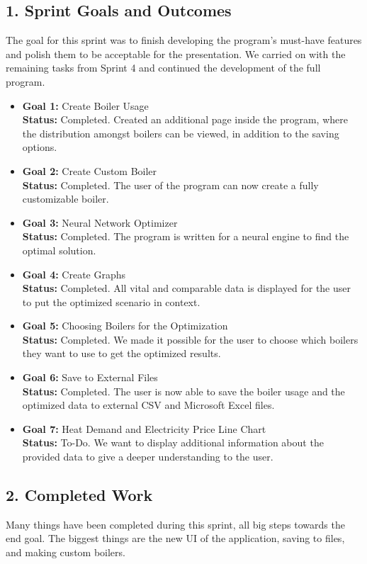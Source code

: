 \documentclass[12pt]{report}
\begin{document}
\subsection*{1. Sprint Goals and Outcomes}
The goal for this sprint was to finish developing the program’s must-have features and polish them to be acceptable for the presentation. We carried on with the remaining tasks from Sprint 4 and continued the development of the full program.
\begin{itemize}
    \item \textbf{Goal 1:} Create Boiler Usage\\
    \textbf{Status:} Completed. Created an additional page inside the program, where the distribution amongst boilers can be viewed, in addition to the saving options.
    \item \textbf{Goal 2:} Create Custom Boiler\\
    \textbf{Status:} Completed. The user of the program can now create a fully customizable boiler.
    \item \textbf{Goal 3:} Neural Network Optimizer\\
    \textbf{Status:} Completed. The program is written for a neural engine to find the optimal solution.
    \item \textbf{Goal 4:} Create Graphs\\
    \textbf{Status:} Completed. All vital and comparable data is displayed for the user to put the optimized scenario in context.
    \item \textbf{Goal 5:} Choosing Boilers for the Optimization\\
    \textbf{Status:} Completed. We made it possible for the user to choose which boilers they want to use to get the optimized results.
    \item \textbf{Goal 6:} Save to External Files\\
    \textbf{Status:} Completed. The user is now able to save the boiler usage and the optimized data to external CSV and Microsoft Excel files.
    \item \textbf{Goal 7:} Heat Demand and Electricity Price Line Chart\\
    \textbf{Status:} To-Do. We want to display additional information about the provided data to give a deeper understanding to the user.
\end{itemize}

\subsection*{2. Completed Work}
Many things have been completed during this sprint, all big steps towards the end goal. The biggest things are the new UI of the application, saving to files, and making custom boilers.
\end{document}
